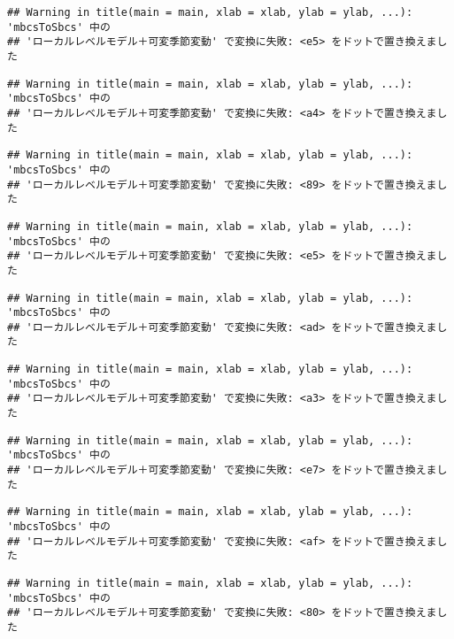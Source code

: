 \documentclass[]{article}
\begin{document}
\begin{verbatim}
## Warning in title(main = main, xlab = xlab, ylab = ylab, ...): 'mbcsToSbcs' 中の
## 'ローカルレベルモデル＋可変季節変動' で変換に失敗: <e5> をドットで置き換えました
\end{verbatim}

\begin{verbatim}
## Warning in title(main = main, xlab = xlab, ylab = ylab, ...): 'mbcsToSbcs' 中の
## 'ローカルレベルモデル＋可変季節変動' で変換に失敗: <a4> をドットで置き換えました
\end{verbatim}

\begin{verbatim}
## Warning in title(main = main, xlab = xlab, ylab = ylab, ...): 'mbcsToSbcs' 中の
## 'ローカルレベルモデル＋可変季節変動' で変換に失敗: <89> をドットで置き換えました
\end{verbatim}

\begin{verbatim}
## Warning in title(main = main, xlab = xlab, ylab = ylab, ...): 'mbcsToSbcs' 中の
## 'ローカルレベルモデル＋可変季節変動' で変換に失敗: <e5> をドットで置き換えました
\end{verbatim}

\begin{verbatim}
## Warning in title(main = main, xlab = xlab, ylab = ylab, ...): 'mbcsToSbcs' 中の
## 'ローカルレベルモデル＋可変季節変動' で変換に失敗: <ad> をドットで置き換えました
\end{verbatim}

\begin{verbatim}
## Warning in title(main = main, xlab = xlab, ylab = ylab, ...): 'mbcsToSbcs' 中の
## 'ローカルレベルモデル＋可変季節変動' で変換に失敗: <a3> をドットで置き換えました
\end{verbatim}

\begin{verbatim}
## Warning in title(main = main, xlab = xlab, ylab = ylab, ...): 'mbcsToSbcs' 中の
## 'ローカルレベルモデル＋可変季節変動' で変換に失敗: <e7> をドットで置き換えました
\end{verbatim}

\begin{verbatim}
## Warning in title(main = main, xlab = xlab, ylab = ylab, ...): 'mbcsToSbcs' 中の
## 'ローカルレベルモデル＋可変季節変動' で変換に失敗: <af> をドットで置き換えました
\end{verbatim}

\begin{verbatim}
## Warning in title(main = main, xlab = xlab, ylab = ylab, ...): 'mbcsToSbcs' 中の
## 'ローカルレベルモデル＋可変季節変動' で変換に失敗: <80> をドットで置き換えました
\end{verbatim}
\end{document}
